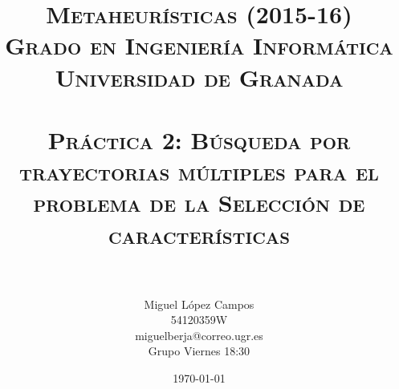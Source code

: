 

\title{
\normalfont \normalsize 
\textsc{{\bf Metaheurísticas (2015-16) \\ Grado en Ingeniería Informática \\ Universidad de Granada} \\ [25pt] %
\horrule{0.5pt} \\[0.4cm] %
\huge Práctica 2: Búsqueda por trayectorias múltiples para el problema de la Selección de características \\ %
\horrule{2pt} \\[0.5cm] %
}}
\author{Miguel López Campos\\ 54120359W\\ miguelberja@correo.ugr.es\\ Grupo Viernes 18:30} %


\date{\normalsize\today} %


	
	\maketitle %
	\newpage %
	
	\tableofcontents %
	\listoffigures

	
	\newpage
	
	\
	
	
	
